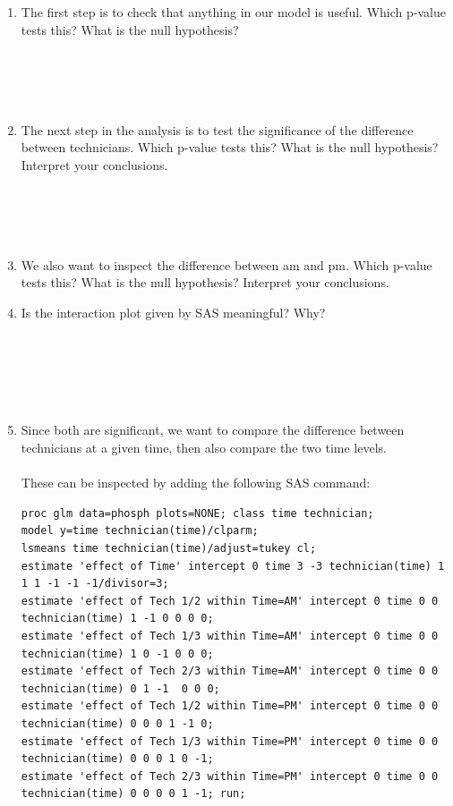\begin{enumerate}
\item The first step is to check that anything in our model is useful.  Which p-value tests this? What is the null hypothesis?\\~\\~\\~\\~\\
\item The next step in the analysis is to test the significance of the difference between technicians.  Which p-value tests this?  What is the null hypothesis?  Interpret your conclusions.\\~\\~\\~\\~\\
\item We also want to inspect the difference between am and pm.  Which p-value tests this?  What is the null hypothesis?  Interpret your conclusions.

\newpage

\item Is the interaction plot given by SAS meaningful?  Why?\\~\\~\\~\\~\\~\\
\item Since both are significant, we want to compare the difference between technicians at a given time, then also compare the two time levels.  \\~\\
These can be inspected by adding the following SAS command:\\
\begin{small}
\begin{verbatim}
proc glm data=phosph plots=NONE; class time technician;
model y=time technician(time)/clparm;
lsmeans time technician(time)/adjust=tukey cl;
estimate 'effect of Time' intercept 0 time 3 -3 technician(time) 1 1 1 -1 -1 -1/divisor=3; 
estimate 'effect of Tech 1/2 within Time=AM' intercept 0 time 0 0 technician(time) 1 -1 0 0 0 0;
estimate 'effect of Tech 1/3 within Time=AM' intercept 0 time 0 0 technician(time) 1 0 -1 0 0 0;
estimate 'effect of Tech 2/3 within Time=AM' intercept 0 time 0 0 technician(time) 0 1 -1  0 0 0;
estimate 'effect of Tech 1/2 within Time=PM' intercept 0 time 0 0 technician(time) 0 0 0 1 -1 0;
estimate 'effect of Tech 1/3 within Time=PM' intercept 0 time 0 0 technician(time) 0 0 0 1 0 -1;
estimate 'effect of Tech 2/3 within Time=PM' intercept 0 time 0 0 technician(time) 0 0 0 0 1 -1; run;
\end{verbatim}
\end{small}


\end{enumerate}
